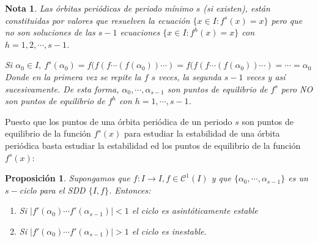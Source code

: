 \documentclass[11pt, a4paper, titlepage]{article}
\theoremstyle{theorem-style}
\newtheorem*{nprop}{Proposición}
\theoremstyle{definition-style}
\theoremstyle{remark-style}
\newtheorem*{nota}{Nota}
\theoremstyle{example-style}
\newenvironment{nlist}
{\begin{enumerate}
\renewcommand\labelenumi{(\emph{\roman{enumi})}}}
{\end{enumerate}}
\begin{document}
\begin{nota}
	Las órbitas periódicas de periodo mínimo $s$ (si existen), están constituidas por valores que resuelven la ecuación $\{x \in I : f^s(x) = x\}$ pero que no son soluciones de las $s-1$ ecuaciones $\{x \in I : f^h(x) = x\}$ con $h=1,2,\cdots, s-1$.
	
	
	Si $\alpha_0 \in I, \ f^s(\alpha_0)= f(f(f\cdots(f(\alpha_0))\cdots)= f(f(f\cdots(f(\alpha_0))\cdots) =  \cdots = \alpha_0$
	Donde en la primera vez se repite la $f$ $s$ veces, la segunda $s-1$ veces y así sucesivamente. De esta forma, $\alpha_0,\cdots,\alpha_{s-1}$ son puntos  de equilibrio de $f^s$ pero NO son puntos de equilibrio de $f^h$ con $h = 1,\cdots, s-1$.
\end{nota}


Puesto que los puntos de una órbita periódica de un periodo $s$ son puntos de equilibrio de la función $f^s(x)$ para estudiar la estabilidad de una órbita periódica basta estudiar la estabilidad ed los puntos de equilibrio de la función $f^s(x)$:
\begin{nprop}
	Supongamos que $f:I \to I, f \in \mathcal{C}^1(I)$ y que $\{\alpha_0,\cdots, \alpha_{s-1}\}$ es un $s-$ciclo para el SDD $\{I,f\}$. Entonces:
	\begin{nlist}
	\item Si $|f'(\alpha_0)\cdots f'(\alpha_{s-1})|<1$ el ciclo es asintóticamente estable
	\item Si $|f'(\alpha_0)\cdots f'(\alpha_{s-1})|>1$ el ciclo es inestable.
\end{nlist}
\end{nprop}
\end{document}
